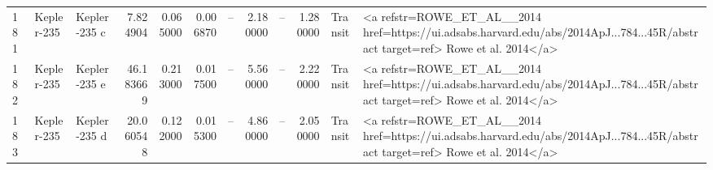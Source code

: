 \begin{tabular}{lllrrrrrrrll}
181 & Kepler-235 & Kepler-235 c & 7.824904 & 0.065000 & 0.006870 & -- & 2.180000 & -- & 1.280000 & Transit & <a refstr=ROWE_ET_AL__2014 href=https://ui.adsabs.harvard.edu/abs/2014ApJ...784...45R/abstract target=ref> Rowe et al. 2014</a> \\
182 & Kepler-235 & Kepler-235 e & 46.183669 & 0.213000 & 0.017500 & -- & 5.560000 & -- & 2.220000 & Transit & <a refstr=ROWE_ET_AL__2014 href=https://ui.adsabs.harvard.edu/abs/2014ApJ...784...45R/abstract target=ref> Rowe et al. 2014</a> \\
183 & Kepler-235 & Kepler-235 d & 20.060548 & 0.122000 & 0.015300 & -- & 4.860000 & -- & 2.050000 & Transit & <a refstr=ROWE_ET_AL__2014 href=https://ui.adsabs.harvard.edu/abs/2014ApJ...784...45R/abstract target=ref> Rowe et al. 2014</a> \\
\bottomrule
\end{tabular}

